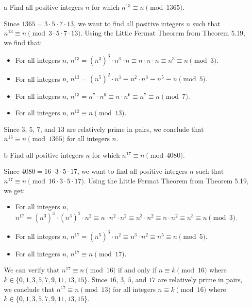 \begin{exercise}{3}{a}
  Find all positive integers \( n \) for which \( n^{13} \equiv n
  \pmod{1365} \).
\end{exercise}

\begin{solution}
  Since \( 1365 = 3 \cdot 5 \cdot 7 \cdot 13 \), we want to find all
  positive integers \( n \) such that \( n^{13} \equiv n \pmod{3 \cdot
    5 \cdot 7 \cdot 13} \). Using the Little Fermat Theorem from
  Theorem 5.19, we find that:
  \begin{itemize}
  \item
    For all integers \( n \), \( n^{13} = \left( n^3 \right)^3 \cdot
    n^3 \cdot n \equiv n \cdot n \cdot n \equiv n^3 \equiv n \pmod{3}.
    \)
  \item
    For all integers \( n \), \( n^{13} = \left( n^5 \right)^2 \cdot
    n^3 \equiv n^2 \cdot n^3 \equiv n^5 \equiv n \pmod{5}. \)
  \item
    For all integers \( n \), \( n^{13} = n^7 \cdot n^6 \equiv n \cdot
    n^6 \equiv n^7 \equiv n \pmod{7}. \)
  \item
    For all integers \( n \), \( n^{13} \equiv n \pmod{13}. \)
  \end{itemize}
  Since \( 3 \), \( 5 \), \( 7 \), and \( 13 \) are relatively prime
  in pairs, we conclude that \( n^{13} \equiv n \pmod{1365} \) for all
  integers \( n \).
\end{solution}


\begin{exercise}{3}{b}
  Find all positive integers \( n \) for which \( n^{17} \equiv n
  \pmod{4080} \).
\end{exercise}

\begin{solution}
  Since \( 4080 = 16 \cdot 3 \cdot 5 \cdot 17 \), we want to find all
  positive integers \( n \) such that \( n^{17} \equiv n \pmod{16
    \cdot 3 \cdot 5 \cdot 17} \). Using the Little Fermat Theorem from
  Theorem 5.19, we get:
  \begin{itemize}
  \item
    For all integers \( n \), \( n^{17} = \left( n^3 \right)^3 \cdot
    \left( n^3 \right)^2 \cdot n^2 \equiv n \cdot n^2 \cdot n^2 \equiv
    n^3 \cdot n^2 \equiv n \cdot n^2 \equiv n^3 \equiv n \pmod{3} \).
  \item
    For all integers \( n \), \( n^{17} = \left( n^{5} \right)^3 \cdot
    n^2 \equiv n^3 \cdot n^2 \equiv n^5 \equiv n \pmod{5} \).
  \item
    For all integers \( n \), \( n^{17} \equiv n \pmod{17} \).
  \end{itemize}
  We can verify that \( n^{17} \equiv n \pmod{16} \) if and only if \(
  n \equiv k \pmod{16} \) where \( k \in \{ 0, 1, 3, 5, 7, 9, 11, 13,
  15 \} \). Since \( 16 \), \( 3 \), \( 5 \), and \( 17 \) are
  relatively prime in pairs, we conclude that \( n^{17} \equiv n
  \pmod{13} \) for all integers \( n \equiv k \pmod{16} \) where \( k
  \in \{ 0, 1, 3, 5, 7, 9, 11, 13, 15 \} \).
\end{solution}


